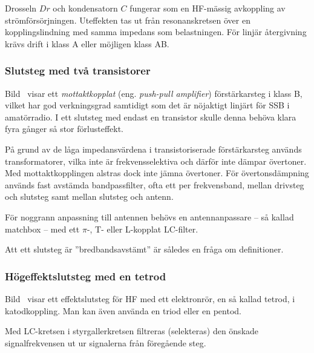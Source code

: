 Drosseln \(Dr\) och kondensatorn \(C\) fungerar som en HF-mässig avkoppling av
strömförsörjningen.
Uteffekten tas ut från resonanskretsen över en kopplingslindning med samma
impedans som belastningen.
För linjär återgivning krävs drift i klass A eller möjligen klass AB.

\subsubsection{Slutsteg med två transistorer}


Bild~ visar ett \emph{mottaktkopplat} (eng.
\emph{push-pull amplifier}) förstärkarsteg i klass B, vilket har god verkningsgrad
samtidigt som det är nöjaktigt linjärt för SSB i amatörradio.
I ett slutsteg med endast en transistor skulle denna behöva klara fyra gånger
så stor förlusteffekt.

På grund av de låga impedansvärdena i transistoriserade förstärkarsteg används
transformatorer, vilka inte är frekvensselektiva och därför inte dämpar
övertoner.
Med mottaktkopplingen alstras dock inte jämna övertoner.
För övertonsdämpning används fast avstämda bandpassfilter, ofta ett per
frekvensband, mellan drivsteg och slutsteg samt mellan slutsteg och antenn.

För noggrann anpassning till antennen behövs en antennanpassare --
så kallad matchbox -- med ett \(\pi \)-, T- eller L-kopplat LC-filter.

Att ett slutsteg är ''bredbandsavstämt'' är således en fråga om definitioner.

\subsubsection{Högeffektslutsteg med en tetrod}


Bild~ visar ett effektslutsteg för HF med ett elektronrör,
en så kallad tetrod, i katodkoppling.
Man kan även använda en triod eller en pentod.

Med LC-kretsen i styrgallerkretsen filtreras (selekteras) den önskade
signalfrekvensen ut ur signalerna från föregående steg.

